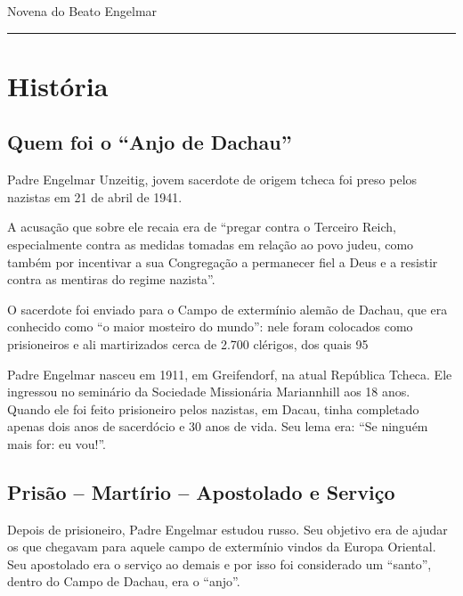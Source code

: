 \documentclass[a4paper,14pt]{extarticle} \usepackage[utf8]{inputenc}
\begin{document}



\begin{center}
  {\huge Novena do Beato Engelmar}
\end{center}



\noindent\rule{\textwidth}{0.4pt}

\tableofcontents

\thispagestyle{empty}


\newpage

\section{História}

\subsection{Quem foi o “Anjo de Dachau”}

Padre Engelmar Unzeitig, jovem sacerdote de origem tcheca foi preso pelos nazistas em 21 de abril de 1941.

A acusação que sobre ele recaia era de “pregar contra o Terceiro Reich, especialmente contra as medidas tomadas em relação ao povo judeu, como também por incentivar a sua Congregação a permanecer fiel a Deus e a resistir contra as mentiras do regime nazista”.

O sacerdote foi enviado para o Campo de extermínio alemão de Dachau, que era conhecido como “o maior mosteiro do mundo”: nele foram colocados como prisioneiros e ali martirizados cerca de 2.700 clérigos, dos quais 95%

Padre Engelmar nasceu em 1911, em Greifendorf, na atual República Tcheca. Ele ingressou
no seminário da Sociedade Missionária Mariannhill aos 18 anos. Quando ele foi feito
prisioneiro pelos nazistas, em Dacau, tinha completado apenas dois anos de sacerdócio
e 30 anos de vida. Seu lema era: “Se ninguém mais for: eu vou!”.

\subsection{Prisão – Martírio – Apostolado e Serviço}

Depois de prisioneiro, Padre Engelmar estudou russo. Seu objetivo era de ajudar os que chegavam para aquele campo de extermínio vindos da Europa Oriental. Seu apostolado era o serviço ao demais e por isso foi considerado um “santo”, dentro do Campo de Dachau, era o “anjo”.
\end{document}
